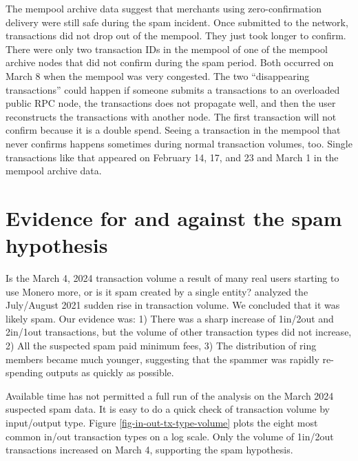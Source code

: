 \documentclass[usletter,11pt,english,openany]{article}
\begin{document}
The mempool archive data suggest that merchants using zero-confirmation
delivery were still safe during the spam incident. Once submitted
to the network, transactions did not drop out of the mempool. They
just took longer to confirm. There were only two transaction IDs in
the mempool of one of the mempool archive nodes that did not confirm
during the spam period. Both occurred on March 8 when the mempool
was very congested. The two ``disappearing transactions'' could
happen if someone submits a transactions to an overloaded public RPC
node, the transactions does not propagate well, and then the user
reconstructs the transactions with another node. The first transaction
will not confirm because it is a double spend. Seeing a transaction
in the mempool that never confirms happens sometimes during normal
transaction volumes, too. Single transactions like that appeared on
February 14, 17, and 23 and March 1 in the mempool archive data.

\section{Evidence for and against the spam hypothesis}

Is the March 4, 2024 transaction volume a result of many real users
starting to use Monero more, or is it spam created by a single entity?
\cite{Krawiec-Thayer2021} analyzed the July/August 2021 sudden rise
in transaction volume. We concluded that it was likely spam. Our evidence
was: 1) There was a sharp increase of 1in/2out and 2in/1out transactions,
but the volume of other transaction types did not increase, 2) All
the suspected spam paid minimum fees, 3) The distribution of ring
members became much younger, suggesting that the spammer was rapidly
re-spending outputs as quickly as possible.

Available time has not permitted a full run of the \cite{Krawiec-Thayer2021}
analysis on the March 2024 suspected spam data. It is easy to do a
quick check of transaction volume by input/output type. Figure \ref{fig-in-out-tx-type-volume}
plots the eight most common in/out transaction types on a log scale.
Only the volume of 1in/2out transactions increased on March 4, supporting
the spam hypothesis.
\end{document}
